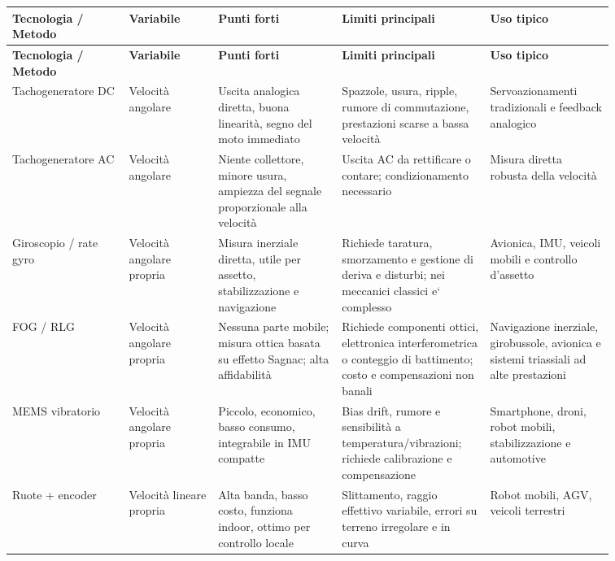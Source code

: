 \documentclass[11pt,a4paper]{article}
\begin{document}
{\renewcommand{\arraystretch}{1.18}
\begin{longtable}{@{}>{\raggedright\arraybackslash}p{0.17\linewidth}>{\raggedright\arraybackslash}p{0.13\linewidth}>{\raggedright\arraybackslash}p{0.18\linewidth}>{\raggedright\arraybackslash}p{0.20\linewidth}>{\raggedright\arraybackslash}p{0.18\linewidth}@{}}
\toprule
\textbf{Tecnologia / Metodo} & \textbf{Variabile} & \textbf{Punti forti} & \textbf{Limiti principali} & \textbf{Uso tipico} \\
\midrule
\endfirsthead
\toprule
\textbf{Tecnologia / Metodo} & \textbf{Variabile} & \textbf{Punti forti} & \textbf{Limiti principali} & \textbf{Uso tipico} \\
\midrule
\endhead
Tachogeneratore DC & Velocit\`a angolare & Uscita analogica diretta, buona linearit\`a, segno del moto immediato & Spazzole, usura, ripple, rumore di commutazione, prestazioni scarse a bassa velocit\`a & Servoazionamenti tradizionali e feedback analogico \\
Tachogeneratore AC & Velocit\`a angolare & Niente collettore, minore usura, ampiezza del segnale proporzionale alla velocit\`a & Uscita AC da rettificare o contare; condizionamento necessario & Misura diretta robusta della velocit\`a \\
Giroscopio / rate gyro & Velocit\`a angolare propria & Misura inerziale diretta, utile per assetto, stabilizzazione e navigazione & Richiede taratura, smorzamento e gestione di deriva e disturbi; nei meccanici classici e` complesso & Avionica, IMU, veicoli mobili e controllo d'assetto \\
FOG / RLG & Velocit\`a angolare propria & Nessuna parte mobile; misura ottica basata su effetto Sagnac; alta affidabilit\`a & Richiede componenti ottici, elettronica interferometrica o conteggio di battimento; costo e compensazioni non banali & Navigazione inerziale, girobussole, avionica e sistemi triassiali ad alte prestazioni \\
MEMS vibratorio & Velocit\`a angolare propria & Piccolo, economico, basso consumo, integrabile in IMU compatte & Bias drift, rumore e sensibilit\`a a temperatura/vibrazioni; richiede calibrazione e compensazione & Smartphone, droni, robot mobili, stabilizzazione e automotive \\
Ruote + encoder & Velocit\`a lineare propria & Alta banda, basso costo, funziona indoor, ottimo per controllo locale & Slittamento, raggio effettivo variabile, errori su terreno irregolare e in curva & Robot mobili, AGV, veicoli terrestri \\

\end{longtable}}
\end{document}
